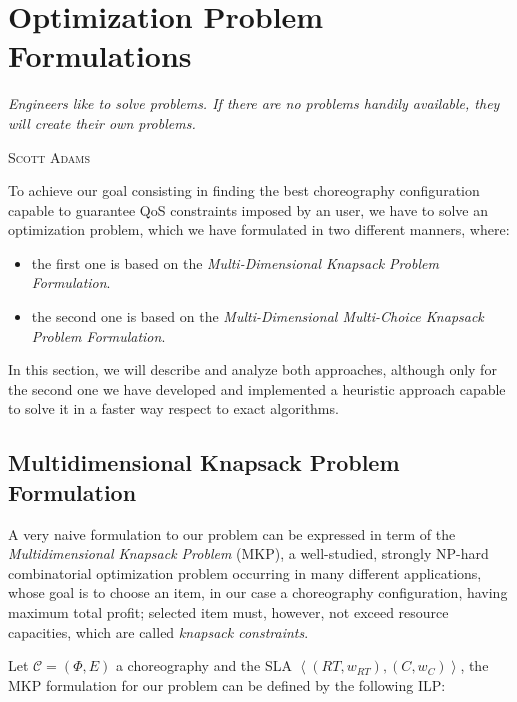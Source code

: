 \documentclass[12pt,a4paper]{report}
\begin{document}
\chapter{Optimization Problem Formulations}\label{chapterOptimizationProble}
\epigraph{\itshape Engineers like to solve problems. If there are no problems handily available, they will create their own problems.}{\textsc{Scott Adams}}

To achieve our goal consisting in finding the best choreography configuration capable to guarantee QoS constraints imposed by an user, we have to solve an optimization problem, which we have formulated in two  different manners, where:

\begin{itemize}
	\item the first one is based on the \textit{Multi-Dimensional Knapsack Problem Formulation}.
	\item the second one is based on the \textit{Multi-Dimensional Multi-Choice Knapsack Problem Formulation}. 
\end{itemize}

In this section, we will describe and analyze both approaches, although only for the second one we have developed and implemented a heuristic approach capable to solve it in a faster way respect to exact algorithms. 

\section{Multidimensional Knapsack Problem Formulation}

A very naive formulation to our problem can be expressed in term of the \textit{Multidimensional Knapsack Problem} (MKP), a well-studied, strongly NP-hard combinatorial optimization problem occurring in many different applications, whose goal is to choose an item, in our case a choreography configuration, having maximum total profit; selected item must, however, not exceed resource capacities, which are called \textit{knapsack constraints}.

Let $\mathcal{C} = (\Phi,E)$ a choreography and the SLA $\left\langle (RT,w_{RT}),(C,w_{C}) \right\rangle$, the MKP formulation for our problem can be defined by the following ILP:
\end{document}
